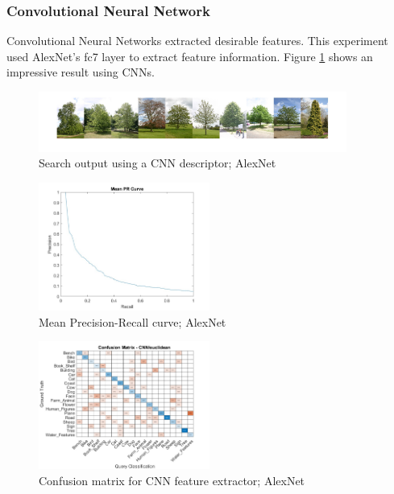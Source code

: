 \subsubsection{Convolutional Neural Network}
\label{sec:results_cnn}

Convolutional Neural Networks extracted desirable features. This experiment used AlexNet's fc7 layer to extract feature
information. Figure \ref{fig:cnn_output} shows an impressive result using CNNs.

\begin{figure}[htbp]
  \begin{center}
    \includegraphics[width=0.9\textwidth]{./assets/plots/CNN/search_output.jpg}
    \caption{Search output using a CNN descriptor; AlexNet}
    \label{fig:cnn_output}
  \end{center}
\end{figure}

\begin{figure}[htbp]
  \begin{center}
    \includegraphics[width=0.5\textwidth]{./assets/plots/CNN/mean_pr_graph.jpg}
    \caption{Mean Precision-Recall curve; AlexNet}
    \label{fig:cnn_mean_pr_graph_q4}
  \end{center}
\end{figure}

\begin{figure}[htbp]
  \begin{center}
    \includegraphics[width=0.5\textwidth]{./assets/plots/CNN/confusion_matrix.jpg}
    \caption{Confusion matrix for CNN feature extractor; AlexNet}
    \label{fig:cnn_confmat}
  \end{center}
\end{figure}
